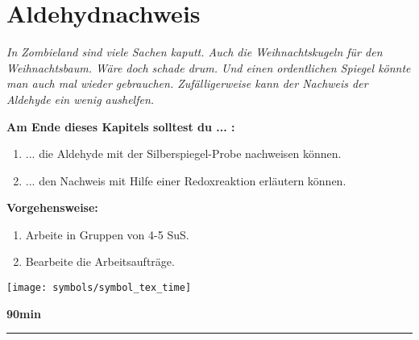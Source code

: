 \documentclass{scrartcl}  %
\begin{document}
\newpage

		\section{Aldehydnachweis}
		
			\textit{In Zombieland sind viele Sachen kaputt. Auch die Weihnachtskugeln für den Weihnachtsbaum. Wäre doch schade drum. Und einen ordentlichen Spiegel könnte man auch mal wieder gebrauchen. Zufälligerweise kann der Nachweis der Aldehyde ein wenig aushelfen.}
			
			\begin{minipage}{0.7\textwidth}
				\noindent \textbf{Am Ende dieses Kapitels solltest du ... :}
				\begin{enumerate}
					\item ... die Aldehyde mit der Silberspiegel-Probe nachweisen können.
					\item ... den Nachweis mit Hilfe einer Redoxreaktion erläutern können. 
				\end{enumerate}	
				
				\noindent \textbf{Vorgehensweise:}
				\begin{enumerate}
					\item Arbeite in Gruppen von 4-5 SuS.
					\item Bearbeite die Arbeitsaufträge.
				\end{enumerate}	
			\end{minipage}
			\hspace{0.1\textwidth}
			\begin{minipage}{0.2\textwidth}
				\begin{tcolorbox}
					[enhanced,
					width=0.9\textwidth,
					colback=white,
					colframe=black,
					fonttitle=\sffamily\bfseries\large, 
					title=Zeit,  %
					attach boxed title to top center={xshift=-0.0mm,yshift=-0.50mm},
					boxed title style={skin=enhancedfirst jigsaw,size=small,arc=1mm,bottom=-1mm,colframe=black,height=0.75cm},
					colbacktitle=black,
					drop lifted shadow]
					\centering
					\texttt{[image: symbols/symbol\_tex\_time]}
					
					\begin{center}
						\textbf{90min}
					\end{center}
				\end{tcolorbox}
			\end{minipage}
			
			\begin{center}
				\noindent\rule{18cm}{0.1pt}
			\end{center}
\newpage
		
\end{document}
